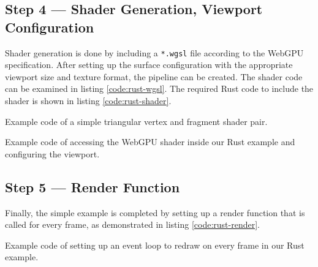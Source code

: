
\subsection{Step 4 --- Shader Generation, Viewport Configuration}
Shader generation is done by including a \lstinline{*.wgsl} file according to the WebGPU specification.
After setting up the surface configuration with the appropriate viewport size and texture format,
the pipeline can be created. The shader code can be examined in listing \ref{code:rust-wgsl}.
The required Rust code to include the shader is shown in listing \ref{code:rust-shader}.


\begin{listing}
  \centering

  \caption[Code Snippet: WGSL Shader Code]
  {
    Example code of a simple triangular vertex and fragment shader pair.
  }
  \label{code:rust-wgsl}
\end{listing}


\begin{listing}
  \centering

  \caption[Code Snippet: Shader and Viewport Setup]
  {
    Example code of accessing the WebGPU shader inside our Rust example and configuring the viewport.
  }
  \label{code:rust-shader}
\end{listing}



\subsection{Step 5 --- Render Function}
Finally, the simple example is completed by setting up a render function that is called for every frame,
as demonstrated in listing \ref{code:rust-render}.

\begin{listing}
  \centering

  \caption[Code Snippet: Event Loop Setup]
  {
    Example code of setting up an event loop to redraw on every frame in our Rust example.
  }
  \label{code:rust-render}
\end{listing}

